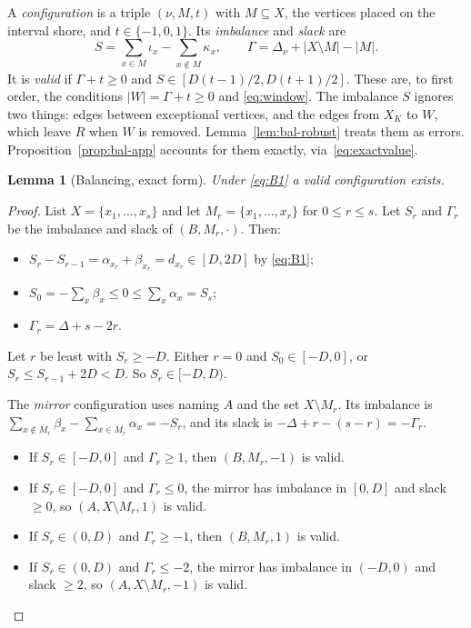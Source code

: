 \documentclass[11pt]{article}
\newtheorem{lemma}[theorem]{Lemma}
\theoremstyle{definition}
\begin{document}
A \emph{configuration} is a triple $(\nu,M,t)$ with $M\subseteq X$, the vertices placed on the interval shore, and $t\in\{-1,0,1\}$. Its \emph{imbalance} and \emph{slack} are
\[
S=\sum_{x\in M}\iota_x-\sum_{x\notin M}\kappa_x,\qquad \Gamma=\Delta_\nu+|X\setminus M|-|M| .
\]
It is \emph{valid} if $\Gamma+t\ge0$ and $S\in[D(t-1)/2,D(t+1)/2]$. These are, to first order, the conditions $|W|=\Gamma+t\ge0$ and \eqref{eq:window}. The imbalance $S$ ignores two things: edges between exceptional vertices, and the edges from $X_K$ to $W$, which leave $R$ when $W$ is removed. Lemma~\ref{lem:bal-robust} treats them as errors. Proposition~\ref{prop:bal-app} accounts for them exactly, via~\eqref{eq:exactvalue}.

\begin{lemma}[Balancing, exact form]\label{lem:bal-exact}
Under \eqref{eq:B1} a valid configuration exists.
\end{lemma}

\begin{proof}
List $X=\{x_1,\dots,x_s\}$ and let $M_r=\{x_1,\dots,x_r\}$ for $0\le r\le s$. Let $S_r$ and $\Gamma_r$ be the imbalance and slack of $(B,M_r,\cdot)$. Then:
\begin{itemize}[nosep]
\item $S_r-S_{r-1}=\alpha_{x_r}+\beta_{x_r}=d_{x_r}\in[D,2D]$ by \eqref{eq:B1};
\item $S_0=-\sum_x\beta_x\le0\le\sum_x\alpha_x=S_s$;
\item $\Gamma_r=\Delta+s-2r$.
\end{itemize}
Let $r$ be least with $S_r\ge-D$. Either $r=0$ and $S_0\in[-D,0]$, or $S_r\le S_{r-1}+2D<D$. So $S_r\in[-D,D)$.

The \emph{mirror} configuration uses naming $A$ and the set $X\setminus M_r$. Its imbalance is $\sum_{x\notin M_r}\beta_x-\sum_{x\in M_r}\alpha_x=-S_r$, and its slack is $-\Delta+r-(s-r)=-\Gamma_r$.
\begin{itemize}[nosep]
\item If $S_r\in[-D,0]$ and $\Gamma_r\ge1$, then $(B,M_r,-1)$ is valid.
\item If $S_r\in[-D,0]$ and $\Gamma_r\le0$, the mirror has imbalance in $[0,D]$ and slack $\ge0$, so $(A,X\setminus M_r,1)$ is valid.
\item If $S_r\in(0,D)$ and $\Gamma_r\ge-1$, then $(B,M_r,1)$ is valid.
\item If $S_r\in(0,D)$ and $\Gamma_r\le-2$, the mirror has imbalance in $(-D,0)$ and slack $\ge2$, so $(A,X\setminus M_r,-1)$ is valid.\qedhere
\end{itemize}
\end{proof}
\end{document}

